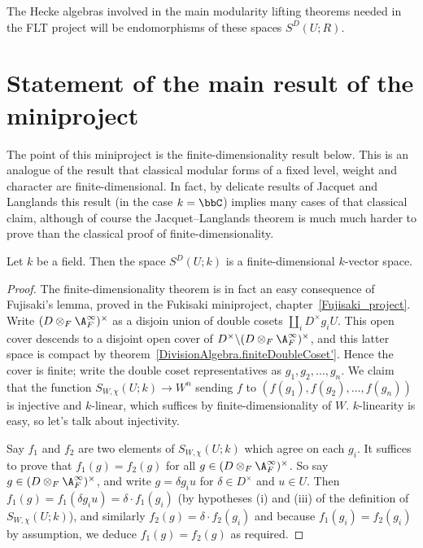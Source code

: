 The Hecke algebras involved in the main modularity lifting
theorems needed in the FLT project will be endomorphisms of these spaces $S^D(U;R)$.

\section{Statement of the main result of the miniproject}

The point of this miniproject is the finite-dimensionality result below.
This is an analogue of the result that classical modular forms of a fixed
level, weight and character are finite-dimensional. In fact, by delicate results
of Jacquet and Langlands this result (in the case $k=\bbC$) implies many cases of that classical claim,
although of course the Jacquet--Langlands theorem is much much harder to prove than the classical
proof of finite-dimensionality.


\begin{theorem}
  \label{TotallyDefiniteQuaternionAlgebra.AutomorphicForm.finiteDimensional}
  Let $k$ be a field. Then the space $S^D(U;k)$ is a finite-dimensional $k$-vector space.
\end{theorem}



\begin{proof}
  The finite-dimensionality theorem is in fact an easy consequence of Fujisaki's lemma,
  proved in the Fukisaki miniproject, chapter~\ref{Fujisaki_project}.
  Write $(D\otimes_F\A_F^\infty)^\times$ as a disjoin union of double cosets
  $\coprod_i D^\times g_i U$. This open cover descends to a disjoint open
  cover of $D^\times\backslash (D\otimes_F\A_F^\infty)^\times$,
  and this latter space is compact by theorem~\ref{DivisionAlgebra.finiteDoubleCoset'}.
  Hence the cover is finite; write the double coset representatives
  as $g_1,g_2,\ldots,g_n$. We claim that
  the function $S_{W,\chi}(U;k)\to W^n$ sending $f$ to $(f(g_1),f(g_2),\ldots,f(g_n))$
  is injective and $k$-linear, which suffices by finite-dimensionality of $W$.
  $k$-linearity is easy, so let's talk about injectivity.

  Say $f_1$ and $f_2$ are two elements of $S_{W,\chi}(U;k)$ which agree on
  each $g_i$. It suffices to prove that $f_1(g)=f_2(g)$ for all
  $g\in(D\otimes_F\A_F^\infty)^\times$. So say $g\in(D\otimes_F\A_F^\infty)^\times$,
  and write $g=\delta g_iu$ for $\delta \in D^\times$ and $u\in U$.
  Then $f_1(g)=f_1(\delta g_iu)=\delta\cdot f_1(g_i)$ (by hypotheses (i) and (iii)
  of the definition of $S_{W,\chi}(U;k)$), and similarly $f_2(g)=\delta\cdot f_2(g_i)$
  and because $f_1(g_i)=f_2(g_i)$ by assumption, we deduce $f_1(g)=f_2(g)$ as required.
\end{proof}
